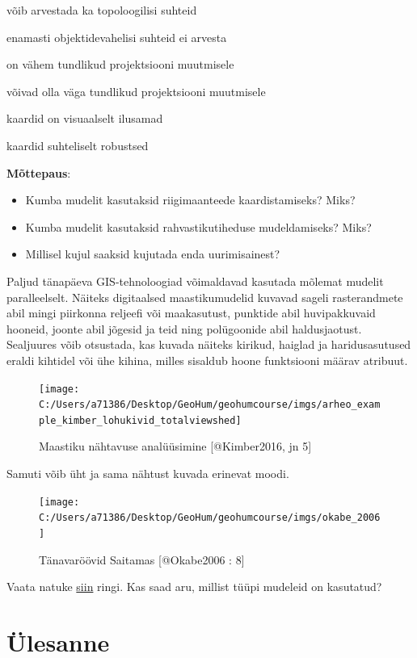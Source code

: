 \documentclass[
]{book}
\providecommand{\tightlist}{%
  \setlength{\itemsep}{0pt}\setlength{\parskip}{0pt}}
\begin{document}
võib arvestada ka topoloogilisi suhteid

enamasti objektidevahelisi suhteid ei arvesta

on vähem tundlikud projektsiooni muutmisele

võivad olla väga tundlikud projektsiooni muutmisele

kaardid on visuaalselt ilusamad

kaardid suhteliselt robustsed

\textbf{Mõttepaus}:

\begin{itemize}
\tightlist
\item
  Kumba mudelit kasutaksid riigimaanteede kaardistamiseks? Miks?\\
\item
  Kumba mudelit kasutaksid rahvastikutiheduse mudeldamiseks? Miks?\\
\item
  Millisel kujul saaksid kujutada enda uurimisainest?
\end{itemize}

Paljud tänapäeva GIS-tehnoloogiad võimaldavad kasutada mõlemat mudelit paralleelselt. Näiteks digitaalsed maastikumudelid kuvavad sageli rasterandmete abil mingi piirkonna reljeefi või maakasutust, punktide abil huvipakkuvaid hooneid, joonte abil jõgesid ja teid ning polügoonide abil haldusjaotust. Sealjuures võib otsustada, kas kuvada näiteks kirikud, haiglad ja haridusasutused eraldi kihtidel või ühe kihina, milles sisaldub hoone funktsiooni määrav atribuut.

\begin{figure}
\texttt{[image: C:/Users/a71386/Desktop/GeoHum/geohumcourse/imgs/arheo\_example\_kimber\_lohukivid\_totalviewshed]} \caption{Maastiku nähtavuse analüüsimine [@Kimber2016, jn 5]}\label{fig:arheo-ex}
\end{figure}

Samuti võib üht ja sama nähtust kuvada erinevat moodi.

\begin{figure}
\texttt{[image: C:/Users/a71386/Desktop/GeoHum/geohumcourse/imgs/okabe\_2006]} \caption{Tänavaröövid Saitamas [@Okabe2006 : 8]}\label{fig:unnamed-chunk-3}
\end{figure}

Vaata natuke \href{http://blog.ut.ee/30-maps-of-estonia-in-30-days/}{siin} ringi. Kas saad aru, millist tüüpi mudeleid on kasutatud?

\hypertarget{uxfclesanne}{%
\section{Ülesanne}\label{uxfclesanne}}
\end{document}
